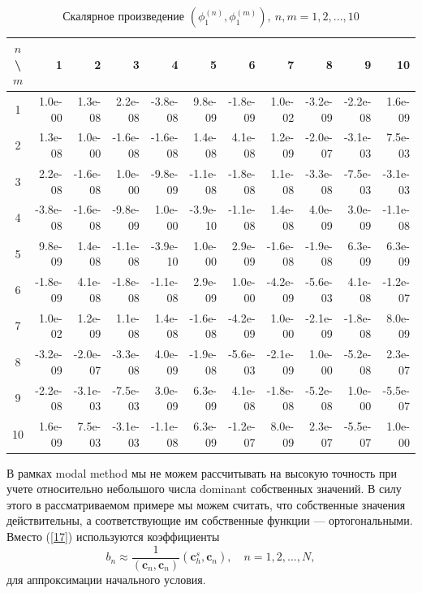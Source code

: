 \documentclass[authoryear]{elsarticle}
\begin{document}
\begin{table}[h]
\caption{Скалярное произведение $(\phi_1^{(n)}, \phi_1^{(m)}), \ n, m = 1,2, ..., 10$}
\label{t-5}
\begin{center}
\footnotesize 
\begin{tabular}{c|rrrrrrrrrr}
\hline
$n$\textbackslash$m$&1&2&3&4&5&6&7&8&9&10 \\
\hline
1 & 1.0e-00 & 1.3e-08 & 2.2e-08 & -3.8e-08 & 9.8e-09 & -1.8e-09 & 1.0e-02 & -3.2e-09 & -2.2e-08 & 1.6e-09 \\ 
2 & 1.3e-08 & 1.0e-00 & -1.6e-08 & -1.6e-08 & 1.4e-08 & 4.1e-08 & 1.2e-09 & -2.0e-07 & -3.1e-03 & 7.5e-03 \\ 
3 & 2.2e-08 & -1.6e-08 & 1.0e-00 & -9.8e-09 & -1.1e-08 & -1.8e-08 & 1.1e-08 & -3.3e-08 & -7.5e-03 & -3.1e-03 \\ 
4 & -3.8e-08 & -1.6e-08 & -9.8e-09 & 1.0e-00 & -3.9e-10 & -1.1e-08 & 1.4e-08 & 4.0e-09 & 3.0e-09 & -1.1e-08 \\ 
5 & 9.8e-09 & 1.4e-08 & -1.1e-08 & -3.9e-10 & 1.0e-00 & 2.9e-09 & -1.6e-08 & -1.9e-08 & 6.3e-09 & 6.3e-09 \\ 
6 & -1.8e-09 & 4.1e-08 & -1.8e-08 & -1.1e-08 & 2.9e-09 & 1.0e-00 & -4.2e-09 & -5.6e-03 & 4.1e-08 & -1.2e-07 \\ 
7 & 1.0e-02 & 1.2e-09 & 1.1e-08 & 1.4e-08 & -1.6e-08 & -4.2e-09 & 1.0e-00 & -2.1e-09 & -1.8e-08 & 8.0e-09 \\ 
8 & -3.2e-09 & -2.0e-07 & -3.3e-08 & 4.0e-09 & -1.9e-08 & -5.6e-03 & -2.1e-09 & 1.0e-00 & -5.2e-08 & 2.3e-07 \\ 
9 & -2.2e-08 & -3.1e-03 & -7.5e-03 & 3.0e-09 & 6.3e-09 & 4.1e-08 & -1.8e-08 & -5.2e-08 & 1.0e-00 & -5.5e-07 \\ 
10 & 1.6e-09 & 7.5e-03 & -3.1e-03 & -1.1e-08 & 6.3e-09 & -1.2e-07 & 8.0e-09 & 2.3e-07 & -5.5e-07 & 1.0e-00 \\ 
\hline
\end{tabular}
\end{center}
\end{table}

В рамках modal method мы не можем рассчитывать на высокую точность при 
учете относительно небольшого числа dominant собственных значений.
В силу этого в рассматриваемом примере мы можем считать, что собственные значения действительны,
а соответствующие им собственные функции --- ортогональными. 
Вместо (\ref{17}) используются коэффициенты
\begin{equation}\label{24}
 b_n \approx  \frac{1}{(\bm c_n, \bm c_n)} (\bm c_h^s, \bm c_n),
 \quad n = 1,2, ..., N ,
\end{equation}
для аппроксимации начального условия.
\end{document}
